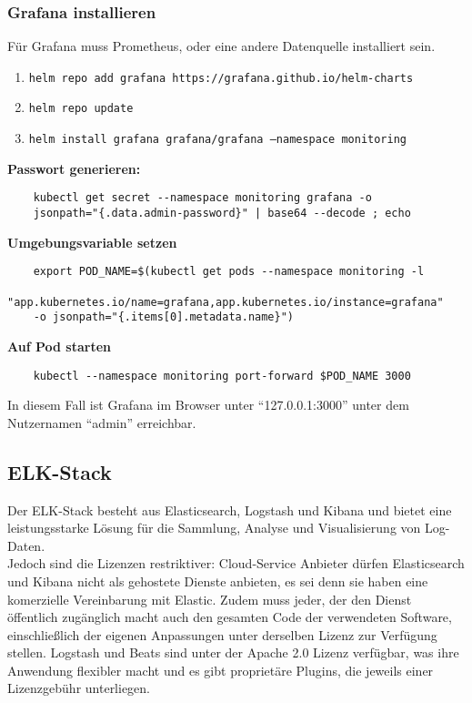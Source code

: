\subsubsection{Grafana installieren}
Für Grafana muss Prometheus, oder eine andere Datenquelle installiert sein.
\begin{enumerate}
    \item \texttt{helm repo add grafana https://grafana.github.io/helm-charts}
    \item \texttt{helm repo update}
    \item \texttt{helm install grafana grafana/grafana --namespace monitoring}
\end{enumerate}
\textbf{Passwort generieren:}
\begin{verbatim}
    kubectl get secret --namespace monitoring grafana -o
    jsonpath="{.data.admin-password}" | base64 --decode ; echo
\end{verbatim}
\textbf{Umgebungsvariable setzen}
\begin{verbatim}
    export POD_NAME=$(kubectl get pods --namespace monitoring -l
    "app.kubernetes.io/name=grafana,app.kubernetes.io/instance=grafana"
    -o jsonpath="{.items[0].metadata.name}")
\end{verbatim}
\textbf{Auf Pod starten}
\begin{verbatim}
    kubectl --namespace monitoring port-forward $POD_NAME 3000
\end{verbatim}
In diesem Fall ist Grafana im Browser unter \enquote{127.0.0.1:3000} unter dem  Nutzernamen \enquote{admin} erreichbar.

\subsection{ELK-Stack}
Der ELK-Stack besteht aus Elasticsearch, Logstash und Kibana und bietet eine leistungsstarke Lösung für die Sammlung, Analyse und Visualisierung von Log-Daten.\\
Jedoch sind die Lizenzen restriktiver: Cloud-Service Anbieter dürfen Elasticsearch und Kibana nicht als gehostete Dienste anbieten, es sei denn sie haben eine komerzielle Vereinbarung mit Elastic. Zudem muss jeder, der den Dienst öffentlich zugänglich macht auch den gesamten Code der verwendeten Software, einschließlich der eigenen Anpassungen unter derselben Lizenz zur Verfügung stellen. Logstash und Beats sind unter der Apache 2.0 Lizenz verfügbar, was ihre Anwendung flexibler macht und es gibt proprietäre Plugins, die jeweils einer Lizenzgebühr unterliegen.

